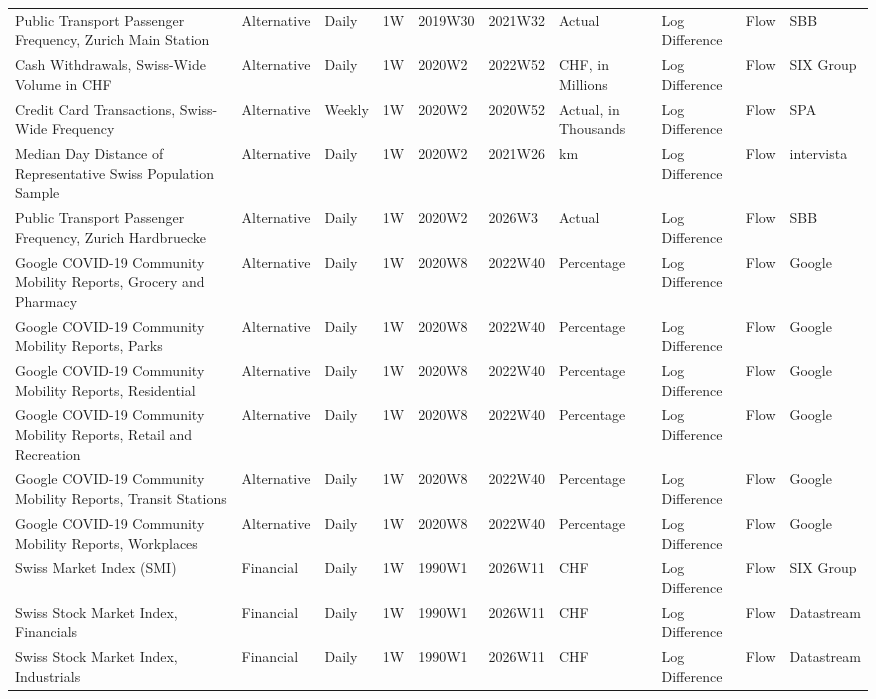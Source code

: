 \begin{table}[ht]
\begin{tabular}{llllllllll}
  Public Transport Passenger Frequency, Zurich Main Station & Alternative & Daily & 1W & 2019W30 & 2021W32 & Actual & Log Difference & Flow & SBB \\ 
  Cash Withdrawals, Swiss-Wide Volume in CHF & Alternative & Daily & 1W & 2020W2 & 2022W52 & CHF, in Millions & Log Difference & Flow & SIX Group \\ 
  Credit Card Transactions, Swiss-Wide Frequency & Alternative & Weekly & 1W & 2020W2 & 2020W52 & Actual, in Thousands & Log Difference & Flow & SPA \\ 
  Median Day Distance of Representative Swiss Population Sample & Alternative & Daily & 1W & 2020W2 & 2021W26 & km & Log Difference & Flow & intervista \\ 
  Public Transport Passenger Frequency, Zurich Hardbruecke & Alternative & Daily & 1W & 2020W2 & 2026W3 & Actual & Log Difference & Flow & SBB \\ 
  Google COVID-19 Community Mobility Reports, Grocery and Pharmacy & Alternative & Daily & 1W & 2020W8 & 2022W40 & Percentage & Log Difference & Flow & Google \\ 
  Google COVID-19 Community Mobility Reports, Parks & Alternative & Daily & 1W & 2020W8 & 2022W40 & Percentage & Log Difference & Flow & Google \\ 
  Google COVID-19 Community Mobility Reports, Residential & Alternative & Daily & 1W & 2020W8 & 2022W40 & Percentage & Log Difference & Flow & Google \\ 
  Google COVID-19 Community Mobility Reports, Retail and Recreation & Alternative & Daily & 1W & 2020W8 & 2022W40 & Percentage & Log Difference & Flow & Google \\ 
  Google COVID-19 Community Mobility Reports, Transit Stations & Alternative & Daily & 1W & 2020W8 & 2022W40 & Percentage & Log Difference & Flow & Google \\ 
  Google COVID-19 Community Mobility Reports, Workplaces & Alternative & Daily & 1W & 2020W8 & 2022W40 & Percentage & Log Difference & Flow & Google \\ 
  Swiss Market Index (SMI)  & Financial & Daily & 1W & 1990W1 & 2026W11 & CHF & Log Difference & Flow & SIX Group \\ 
  Swiss Stock Market Index, Financials & Financial & Daily & 1W & 1990W1 & 2026W11 & CHF & Log Difference & Flow & Datastream \\ 
  Swiss Stock Market Index, Industrials & Financial & Daily & 1W & 1990W1 & 2026W11 & CHF & Log Difference & Flow & Datastream \\ 

\end{tabular}
\end{table}
